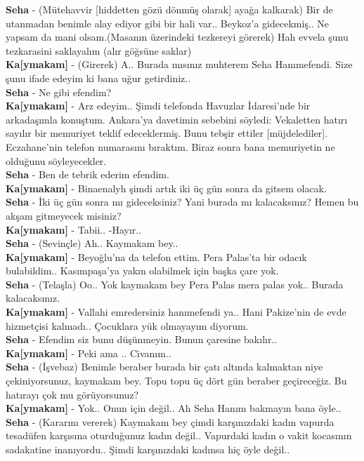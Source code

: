 \documentclass[]{book}
\begin{document}
\textbf{Seha} - (Mütehavvir {[}hiddetten gözü dönmüş olarak{]} ayağa kalkarak) Bir de utanmadan benimle alay ediyor gibi bir hali var.. Beykoz'a gidecekmiş.. Ne yapsam da mani olsam.(Masanın üzerindeki tezkereyi görerek) Hah evvela şunu tezkarasini saklayalım (alır göğsüne saklar)\\
\textbf{Ka{[}ymakam{]}} - (Girerek) A.. Burada mısınız muhterem Seha Hanımefendi. Size şunu ifade edeyim ki bana uğur getirdiniz..\\
\textbf{Seha} - Ne gibi efendim?\\
\textbf{Ka{[}ymakam{]}} - Arz edeyim.. Şimdi telefonda Havuzlar İdaresi'nde bir arkadaşımla konuştum. Ankara'ya davetimin sebebini söyledi: Vekaletten hatırı sayılır bir memuriyet teklif edeceklermiş. Bunu tebşir ettiler {[}müjdelediler{]}. Eczahane'nin telefon numarasını bıraktım. Biraz sonra bana memuriyetin ne olduğunu söyleyecekler.\\
\textbf{Seha} - Ben de tebrik ederim efendim.\\
\textbf{Ka{[}ymakam{]}} - Binaenalyh şimdi artık iki üç gün sonra da gitsem olacak.\\
\textbf{Seha} - İki üç gün sonra mı gideceksiniz? Yani burada mı kalacaksınız? Hemen bu akşam gitmeyecek misiniz?\\
\textbf{Ka{[}ymakam{]}} - Tabii.. -Hayır..\\
\textbf{Seha} - (Sevinçle) Ah.. Kaymakam bey..\\
\textbf{Ka{[}ymakam{]}} - Beyoğlu'na da telefon ettim. Pera Palas'ta bir odacık bulabildim.. Kasımpaşa'ya yakın olabilmek için başka çare yok.\\
\textbf{Seha} - (Telaşla) Oo.. Yok kaymakam bey Pera Palas mera palas yok.. Burada kalacaksınız.\\
\textbf{Ka{[}ymakam{]}} - Vallahi emredersiniz hanımefendi ya.. Hani Pakize'nin de evde hizmetçisi kalmadı.. Çocuklara yük olmayayım diyorum.\\
\textbf{Seha} - Efendim siz bunu düşünmeyin. Bunun çaresine bakılır..\\
\textbf{Ka{[}ymakam{]}} - Peki ama .. Civanım..\\
\textbf{Seha} - (İşvebaz) Benimle beraber burada bir çatı altında kalmaktan niye çekiniyorsunuz, kaymakam bey. Topu topu üç dört gün beraber geçireceğiz. Bu hatırayı çok mu görüyorsunuz?\\
\textbf{Ka{[}ymakam{]}} - Yok.. Onun için değil.. Ah Seha Hanım bakmayın bana öyle..\\
\textbf{Seha} - (Kararını vererek) Kaymakam bey çimdi karşınızdaki kadın vapurda tesadüfen karşısına oturduğunuz kadın değil.. Vapurdaki kadın o vakit kocasının sadakatine inanıyordu.. Şimdi karşınızdaki kadınsa hiç öyle değil..\\
\end{document}
